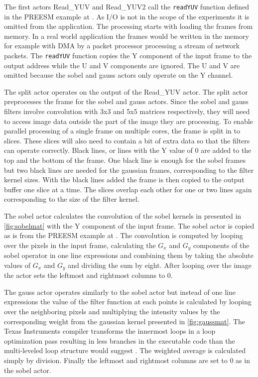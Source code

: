 The first actors Read\_YUV and Read\_YUV2 call the \texttt{readYUV} function defined in the PREESM example at \cite{preesmtut}. As I/O is not in the scope of the experiments it is omitted from the application. The processing starts with loading the frames from memory. In a real world application the frames would be written in the memory for example with DMA by a packet processor processing a stream of network packets. The \texttt{readYUV} function copies the Y component of the input frame to the output address while the U and V components are ignored. The U and V are omitted because the sobel and gauss actors only operate on the Y channel. 

The split actor operates on the output of the Read\_YUV actor. The split actor preprocesses the frame for the sobel and gauss actors. Since the sobel and gauss filters involve convolution with 3x3 and 5x5 matrices respectively, they will need to access image data outside the part of the image they are processing. To enable parallel processing of a single frame on multiple cores, the frame is split in to slices. These slices will also need to contain a bit of extra data so that the filters can operate correctly. Black lines, or lines with the Y value of 0 are added to the top and the bottom of the frame. One black line is enough for the sobel frames but two black lines are needed for the gaussian frames, corresponding to the filter kernel sizes. With the black lines added the frame is then copied to the output buffer one slice at a time. The slices overlap each other for one or two lines again corresponding to the size of the filter kernel.

The sobel actor calculates the convolution of the sobel kernels in presented in \ref{fig:sobelmat} with the Y component of the input frame. The sobel actor is copied as is from the PREESM example at \cite{preesmtut}. The convolution is computed by looping over the pixels in the input frame, calculating the $G_{x}$ and $G_{y}$ components of the sobel operator in one line expressions and combining them by taking the absolute values of $G_{x}$ and $G_{y}$ and dividing the sum by eight. After looping over the image the actor sets the leftmost and rightmost columns to 0.

The gauss actor operates similarly to the sobel actor but instead of one line expressions the value of the filter function at each points is calculated by looping over the neighboring pixels and multiplying the intensity values by the corresponding weight from the gaussian kernel presented in \ref{fig:gaussmat}. The Texas Instruments compiler transforms the innermost loops in a loop optimization pass resulting in less branches in the executable code than the multi-leveled loop structure would suggest . The weighted average is calculated simply by division. Finally the leftmost and rightmost columns are set to 0 as in the sobel actor.


